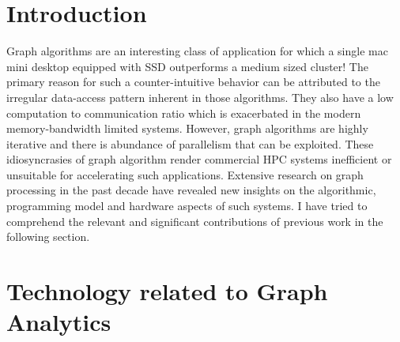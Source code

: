 \documentclass[journal,onecolumn]{IEEEtran}
\begin{document}




\maketitle








%
\IEEEpeerreviewmaketitle



\section{Introduction}
Graph algorithms are an interesting class of application for which a single mac mini desktop equipped with SSD outperforms a medium sized cluster! \cite{GraphChi} The primary reason for such a counter-intuitive behavior can be attributed to the irregular data-access pattern inherent in those algorithms. They also have a low computation to communication ratio which is exacerbated in the modern memory-bandwidth limited systems. However, graph algorithms are highly iterative and there is abundance of parallelism that can be exploited. These idiosyncrasies of graph algorithm render commercial HPC systems inefficient or unsuitable for accelerating such applications. Extensive research on graph processing in the past decade have revealed new insights on the algorithmic, programming model and hardware aspects of such systems. I have tried to comprehend the relevant and significant contributions of previous work in the following section.

\section{Technology related to Graph Analytics}
\end{document}

